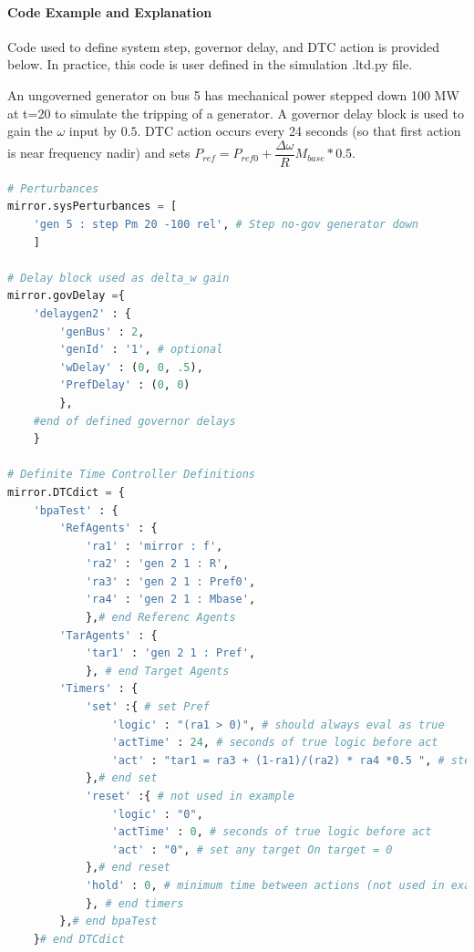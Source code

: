 \documentclass[12pt]{article}
\begin{document}
\pagebreak
\paragraph{Code Example and Explanation}
Code used to define system step, governor delay, and DTC action is provided below.
In practice, this code is user defined in the simulation .ltd.py file.\\
\vspace{1em}

An ungoverned generator on bus 5 has mechanical power stepped down 100 MW at t=20 to simulate the tripping of a generator.
A governor delay block is used to gain the $\omega$ input by $0.5$.
DTC action occurs every 24 seconds (so that first action is near frequency nadir) and sets  $P_{ref} = P_{ref0} + \dfrac{\Delta \omega}{R}M_{base} * 0.5 $.\\

\vspace{1em}

\begin{lstlisting}[language=Python]
# Perturbances
mirror.sysPerturbances = [
    'gen 5 : step Pm 20 -100 rel', # Step no-gov generator down
    ]

# Delay block used as delta_w gain
mirror.govDelay ={
    'delaygen2' : {
        'genBus' : 2,
        'genId' : '1', # optional
        'wDelay' : (0, 0, .5),
        'PrefDelay' : (0, 0)
        },
    #end of defined governor delays
    }

# Definite Time Controller Definitions
mirror.DTCdict = {
    'bpaTest' : {
        'RefAgents' : {
            'ra1' : 'mirror : f',
            'ra2' : 'gen 2 1 : R', 
            'ra3' : 'gen 2 1 : Pref0',
            'ra4' : 'gen 2 1 : Mbase',
            },# end Referenc Agents
        'TarAgents' : {
            'tar1' : 'gen 2 1 : Pref',
            }, # end Target Agents
        'Timers' : {
            'set' :{ # set Pref
                'logic' : "(ra1 > 0)", # should always eval as true
                'actTime' : 24, # seconds of true logic before act
                'act' : "tar1 = ra3 + (1-ra1)/(ra2) * ra4 *0.5 ", # step Pref 
            },# end set
            'reset' :{ # not used in example
                'logic' : "0",
                'actTime' : 0, # seconds of true logic before act
                'act' : "0", # set any target On target = 0
            },# end reset
            'hold' : 0, # minimum time between actions (not used in example)
            }, # end timers
        },# end bpaTest
    }# end DTCdict

\end{lstlisting}
\end{document}
